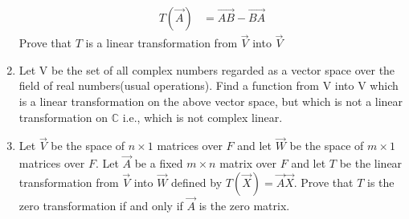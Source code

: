 \begin{enumerate}[label=\thesubsection.\arabic*.,ref=\thesubsection.\theenumi]
\begin{align*}
    T(\vec{A}) &= \vec{AB} - \vec{BA}
\end{align*}
Prove that $T$ is a linear transformation from $\vec{V}$ into $\vec{V}$
%
\solution

%
\item Let V be the set of all complex numbers regarded as a vector space over the field of real numbers(usual operations). Find a function from V into V which is a linear transformation on the above vector space, but which is not a linear transformation on $\mathbb{C}$ i.e., which is not complex linear.
%
\\
\solution

%
\item Let $\vec{V}$ be the space of $n \times 1$ matrices over $F$ and let $\vec{W}$ be the space of $m \times 1$ matrices over $F$. Let $\vec{A}$ be a fixed $m \times n$ matrix over $F$ and let $T$ be the linear transformation from $\vec{V}$ into $\vec{W}$ defined by $T(\vec{X}) = \vec{A}\vec{X}$. Prove that $T$ is the zero transformation if and only if $\vec{A}$ is the zero matrix.
%
\solution

\end{enumerate}
